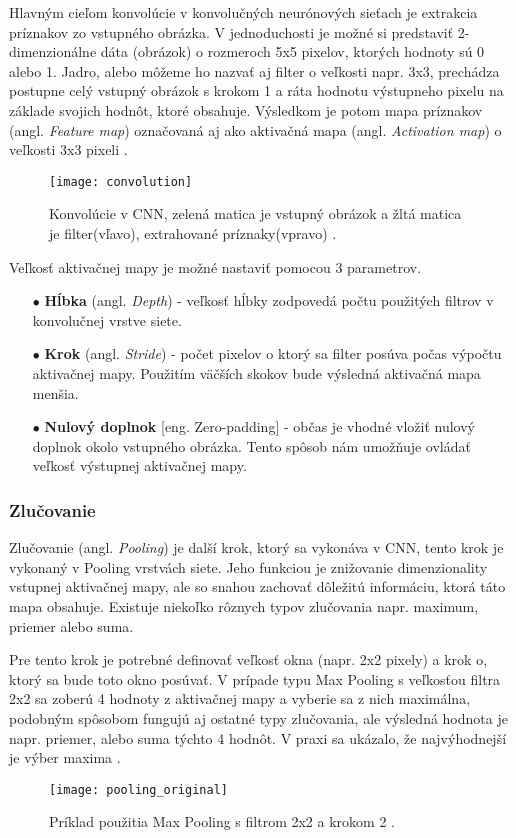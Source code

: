 Hlavným cieľom konvolúcie v konvolučných neurónových sieťach je extrakcia príznakov zo vstupného obrázka.
V jednoduchosti je možné si predstaviť 2-dimenzionálne dáta (obrázok) o rozmeroch 5x5 pixelov, ktorých hodnoty sú 0 alebo 1.
Jadro, alebo môžeme ho nazvať aj filter o veľkosti napr. 3x3, prechádza postupne celý vstupný obrázok s krokom 1 a ráta hodnotu výstupneho pixelu na základe svojich hodnôt, ktoré obsahuje.
Výsledkom je potom mapa príznakov (angl. \textit{Feature map}) označovaná aj ako aktivačná mapa (angl. \textit{Activation map}) o veľkosti 3x3 pixeli \cite{odkaz:CNNArticle}.
\begin{figure}[H]
    \centering
    \texttt{[image: convolution]}
    \caption{Konvolúcie v CNN, zelená matica je vstupný obrázok a žltá matica je filter(vľavo), extrahované príznaky(vpravo) \cite{odkaz:CNNArticle}.}
    \label{pic:Convolution}
\end{figure}

Veľkosť aktivačnej mapy je možné nastaviť pomocou 3 parametrov.
\begin{enumerate}
    \item[$\bullet$] \textbf{Hĺbka} (angl. \textit{Depth}) - veľkosť hĺbky zodpovedá počtu použitých filtrov v konvolučnej vrstve siete.
    \item[$\bullet$] \textbf{Krok} (angl. \textit{Stride}) - počet pixelov o ktorý sa filter posúva počas výpočtu aktivačnej mapy.
    Použitím väčších skokov bude výsledná aktivačná mapa menšia.
    \item[$\bullet$] \textbf{Nulový doplnok} [eng. Zero-padding] - občas je vhodné vložiť nulový doplnok okolo vstupného obrázka.
    Tento spôsob nám umožňuje ovládať veľkosť výstupnej aktivačnej mapy.
\end{enumerate}


\subsubsection{Zlučovanie}
Zlučovanie (angl. \textit{Pooling}) je další krok, ktorý sa vykonáva v CNN, tento krok je vykonaný v Pooling vrstvách siete.
Jeho funkciou je znižovanie dimenzionality vstupnej aktivačnej mapy, ale so snahou zachovať dôležitú informáciu, ktorá táto mapa obsahuje.
Existuje niekoľko rôznych typov zlučovania napr. maximum, priemer alebo suma.

Pre tento krok je potrebné definovať veľkosť okna (napr. 2x2 pixely) a krok o, ktorý sa bude toto okno posúvať.
V prípade typu Max Pooling s veľkosťou filtra 2x2 sa zoberú 4 hodnoty z aktivačnej mapy a vyberie sa z nich maximálna, podobným spôsobom
    fungujú aj ostatné typy zlučovania, ale výsledná hodnota je napr. priemer, alebo suma týchto 4 hodnôt.
V praxi sa ukázalo, že najvýhodnejší je výber maxima \cite{odkaz:CNNArticle}.
\begin{figure}[H]
    \centering
    \texttt{[image: pooling\_original]}
    \caption{Príklad použitia Max Pooling s filtrom 2x2 a krokom 2 \cite{odkaz:CNNArticle}.}
    \label{pic:Convolution}
\end{figure}


